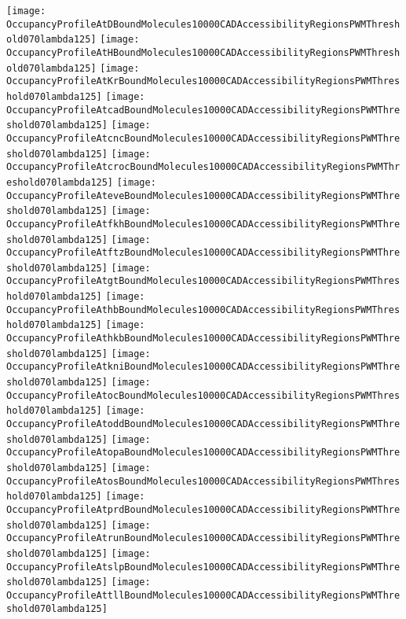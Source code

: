 \documentclass[11pt]{article}
\begin{document}
 


\begin{center}
\texttt{[image: OccupancyProfileAtDBoundMolecules10000CADAccessibilityRegionsPWMThreshold070lambda125]}
\texttt{[image: OccupancyProfileAtHBoundMolecules10000CADAccessibilityRegionsPWMThreshold070lambda125]}
\texttt{[image: OccupancyProfileAtKrBoundMolecules10000CADAccessibilityRegionsPWMThreshold070lambda125]}
\texttt{[image: OccupancyProfileAtcadBoundMolecules10000CADAccessibilityRegionsPWMThreshold070lambda125]}
\texttt{[image: OccupancyProfileAtcncBoundMolecules10000CADAccessibilityRegionsPWMThreshold070lambda125]}
\texttt{[image: OccupancyProfileAtcrocBoundMolecules10000CADAccessibilityRegionsPWMThreshold070lambda125]}
\texttt{[image: OccupancyProfileAteveBoundMolecules10000CADAccessibilityRegionsPWMThreshold070lambda125]}
\texttt{[image: OccupancyProfileAtfkhBoundMolecules10000CADAccessibilityRegionsPWMThreshold070lambda125]}
\texttt{[image: OccupancyProfileAtftzBoundMolecules10000CADAccessibilityRegionsPWMThreshold070lambda125]}
\texttt{[image: OccupancyProfileAtgtBoundMolecules10000CADAccessibilityRegionsPWMThreshold070lambda125]}
\texttt{[image: OccupancyProfileAthbBoundMolecules10000CADAccessibilityRegionsPWMThreshold070lambda125]}
\texttt{[image: OccupancyProfileAthkbBoundMolecules10000CADAccessibilityRegionsPWMThreshold070lambda125]}
\texttt{[image: OccupancyProfileAtkniBoundMolecules10000CADAccessibilityRegionsPWMThreshold070lambda125]}
\texttt{[image: OccupancyProfileAtocBoundMolecules10000CADAccessibilityRegionsPWMThreshold070lambda125]}
\texttt{[image: OccupancyProfileAtoddBoundMolecules10000CADAccessibilityRegionsPWMThreshold070lambda125]}
\texttt{[image: OccupancyProfileAtopaBoundMolecules10000CADAccessibilityRegionsPWMThreshold070lambda125]}
\texttt{[image: OccupancyProfileAtosBoundMolecules10000CADAccessibilityRegionsPWMThreshold070lambda125]}
\texttt{[image: OccupancyProfileAtprdBoundMolecules10000CADAccessibilityRegionsPWMThreshold070lambda125]}
\texttt{[image: OccupancyProfileAtrunBoundMolecules10000CADAccessibilityRegionsPWMThreshold070lambda125]}
\texttt{[image: OccupancyProfileAtslpBoundMolecules10000CADAccessibilityRegionsPWMThreshold070lambda125]}
\texttt{[image: OccupancyProfileAttllBoundMolecules10000CADAccessibilityRegionsPWMThreshold070lambda125]}
\end{center}






\end{document}
